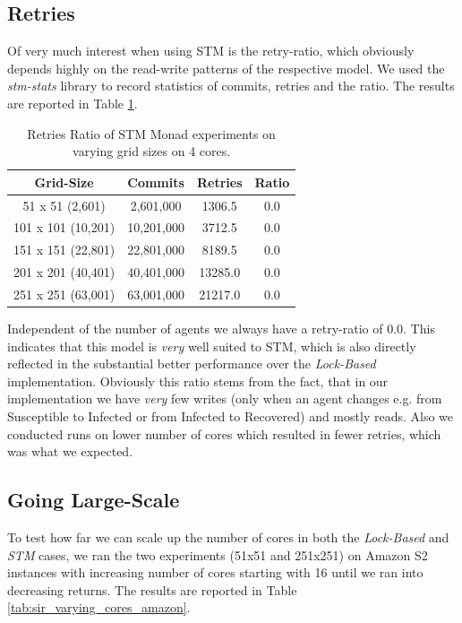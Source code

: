 \subsection{Retries}
Of very much interest when using STM is the retry-ratio, which obviously depends highly on the read-write patterns of the respective model. We used the \textit{stm-stats} library to record statistics of commits, retries and the ratio. The results are reported in Table \ref{tab:retries_stm}.

\begin{table}
	\centering
  	\begin{tabular}{ c || c | c | c }
        Grid-Size 		   & Commits    & Retries & Ratio \\ \hline \hline 
   		51 x 51 (2,601)    & 2,601,000  & 1306.5  & 0.0 \\ \hline
   		101 x 101 (10,201) & 10,201,000 & 3712.5  & 0.0 \\ \hline
   		151 x 151 (22,801) & 22,801,000 & 8189.5  & 0.0 \\ \hline
   		201 x 201 (40,401) & 40,401,000 & 13285.0 & 0.0 \\ \hline 
   		251 x 251 (63,001) & 63,001,000 & 21217.0 & 0.0 \\ \hline \hline
  	\end{tabular}
  	
  	\caption{Retries Ratio of STM Monad experiments on varying grid sizes on 4 cores.}
	\label{tab:retries_stm}
\end{table}

Independent of the number of agents we always have a retry-ratio of 0.0. This indicates that this model is \textit{very} well suited to STM, which is also directly reflected in the substantial better performance over the \textit{Lock-Based} implementation. Obviously this ratio stems from the fact, that in our implementation we have \textit{very} few writes (only when an agent changes e.g. from Susceptible to Infected or from Infected to Recovered) and mostly reads. Also we conducted runs on lower number of cores which resulted in fewer retries, which was what we expected.

\subsection{Going Large-Scale}
To test how far we can scale up the number of cores in both the \textit{Lock-Based} and \textit{STM} cases, we ran the two experiments (51x51 and 251x251) on Amazon S2 instances with increasing number of cores starting with 16 until we ran into decreasing returns. The results are reported in Table \ref{tab:sir_varying_cores_amazon}.

